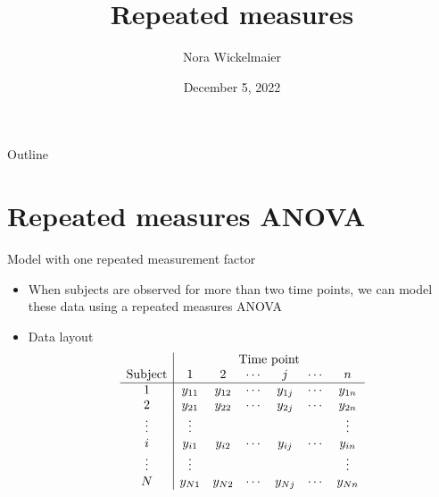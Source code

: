 \documentclass[aspectratio=169]{beamer}
\title{Repeated measures}
\author{Nora Wickelmaier}
\date{December 5, 2022}
\begin{document}
\begin{frame}{}
\thispagestyle{empty}
\titlepage
\end{frame}

\begin{frame}{Outline}
\tableofcontents
\end{frame}

\section{Repeated measures ANOVA}

\begin{frame}{Model with one repeated measurement factor}
  \begin{itemize}
    \item When subjects are observed for more than two time points, we can
      model these data using a repeated measures ANOVA
    \item Data layout
\[ \begin{array}{c|cccccc}
              & \multicolumn{6}{c}{\text{Time point}} \\
\text{Subject} & 1 & 2 & \cdots & j & \cdots & n \\ \hline
1      & y_{11} & y_{12} & \cdots & y_{1j} & \cdots & y_{1n} \\
2      & y_{21} & y_{22} & \cdots & y_{2j} & \cdots & y_{2n} \\
\vdots & \vdots &        &        &        &        & \vdots \\
i      & y_{i1} & y_{i2} & \cdots & y_{ij} & \cdots & y_{in} \\
\vdots & \vdots &        &        &        &        & \vdots \\
N      & y_{N1} & y_{N2} & \cdots & y_{Nj} & \cdots & y_{Nn} \\
\end{array} \]
  \end{itemize}
\end{frame}
\end{document}
